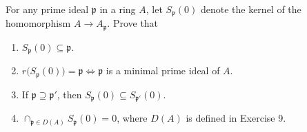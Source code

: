 \begin{exercise}
	For any prime ideal $\mathfrak{p}$ in a ring $A$, let $S_\mathfrak{p}(0)$ denote the kernel of the homomorphism $A \to A_\mathfrak{p}$. Prove that 
	\begin{enumerate}
		\item $S_\mathfrak{p}(0) \subseteq \mathfrak{p}$.
		\item $r\big(S_\mathfrak{p}(0)\big) = \mathfrak{p} \iff \mathfrak{p}$ is a minimal prime ideal of $A$.
		\item If $\mathfrak{p} \supseteq \mathfrak{p}'$, then $S_\mathfrak{p}(0) \subseteq S_{\mathfrak{p} '}(0)$.
		\item $\cap_{\mathfrak{p} \in D(A)} S_\mathfrak{p}(0) = 0$, where $D(A)$ is defined in Exercise 9.
	\end{enumerate}
\end{exercise}
